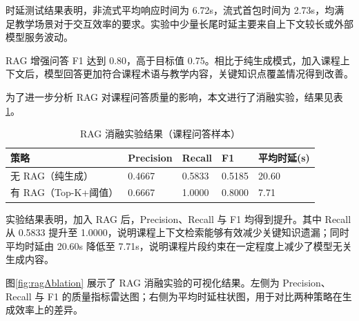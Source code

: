 \documentclass[12pt,a4paper,oneside]{ctexbook}
\numberwithin{equation}{chapter}
\begin{document}
时延测试结果表明，非流式平均响应时间为 6.72s，流式首包时间为 2.73s，均满足教学场景对于交互效率的要求。实验中少量长尾时延主要来自上下文较长或外部模型服务波动。

RAG 增强问答 F1 达到 0.80，高于目标值 0.75。相比于纯生成模式，加入课程上下文后，模型回答更加符合课程术语与教学内容，关键知识点覆盖情况得到改善。

为了进一步分析 RAG 对课程问答质量的影响，本文进行了消融实验，结果见表\ref{tab:ablation}。

\begin{table}[H]
  \centering
  \caption{RAG 消融实验结果（课程问答样本）}
  \label{tab:ablation}
  \begin{tabular}{p{4.5cm}p{2.0cm}p{2.0cm}p{2.0cm}p{2.0cm}}
    \toprule
    策略 & Precision & Recall & F1 & 平均时延(s) \\
    \midrule
    无 RAG（纯生成） & 0.4667 & 0.5833 & 0.5185 & 20.60 \\
    有 RAG（Top-K+阈值） & 0.6667 & 1.0000 & 0.8000 & 7.71 \\
    \bottomrule
  \end{tabular}
\end{table}

实验结果表明，加入 RAG 后，Precision、Recall 与 F1 均得到提升。其中 Recall 从 0.5833 提升至 1.0000，说明课程上下文检索能够有效减少关键知识遗漏；同时平均时延由 20.60s 降低至 7.71s，说明课程片段约束在一定程度上减少了模型无关生成内容。

图\ref{fig:ragAblation} 展示了 RAG 消融实验的可视化结果。左侧为 Precision、Recall 与 F1 的质量指标雷达图；右侧为平均时延柱状图，用于对比两种策略在生成效率上的差异。
\end{document}
